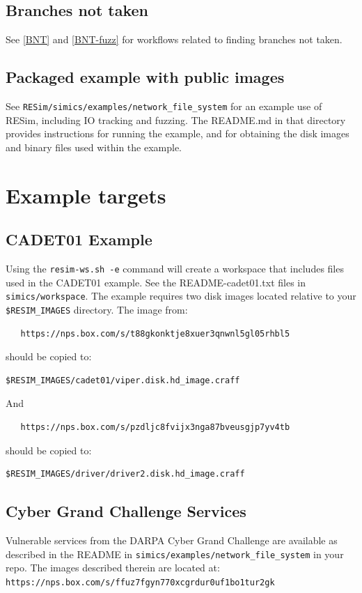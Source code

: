 \documentclass[titlepage]{article}
\begin{document}
\subsection{Branches not taken}
See \ref{BNT} and \ref{BNT-fuzz} for workflows related to finding branches not taken.

\subsection{Packaged example with public images}
See {\tt RESim/simics/examples/network\_file\_system} for an example use of RESim, including IO tracking and fuzzing.
The README.md in that directory provides instructions for running the example, and for obtaining the disk images
and binary files used within the example.

\section{Example targets}
\label{example-targets}
\subsection{CADET01 Example}
Using the {\tt resim-ws.sh -e} command will create a workspace that includes files used in the CADET01 example.
See the README-cadet01.txt files in {\tt simics/workspace}.
The example requires two disk images located relative to your {\tt \$RESIM\_IMAGES} directory.  The image from: 
\begin{verbatim}
   https://nps.box.com/s/t88gkonktje8xuer3qnwnl5gl05rhbl5
\end{verbatim}
\noindent should be copied to:
\begin{verbatim}
$RESIM_IMAGES/cadet01/viper.disk.hd_image.craff
\end{verbatim}
And
\begin{verbatim}
   https://nps.box.com/s/pzdljc8fvijx3nga87bveusgjp7yv4tb
\end{verbatim}
\noindent should be copied to:
\begin{verbatim}
$RESIM_IMAGES/driver/driver2.disk.hd_image.craff
\end{verbatim}



\subsection{Cyber Grand Challenge Services}
Vulnerable services from the DARPA Cyber Grand Challenge are available as described in the
README in {\tt simics/examples/network\_file\_system} in your repo.
The images described therein are located at: 
\newline
{\tt https://nps.box.com/s/ffuz7fgyn770xcgrdur0uf1bo1tur2gk}
\end{document}
